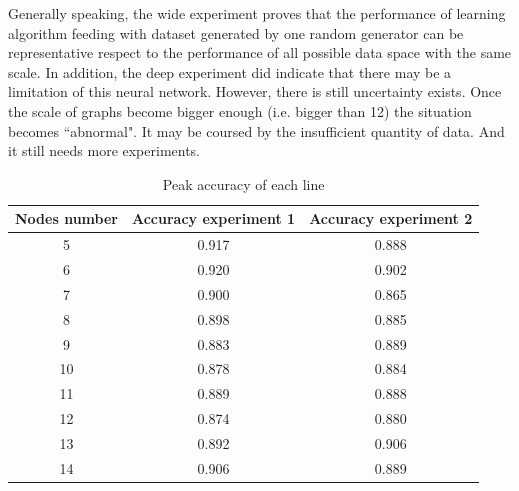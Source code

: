 Generally speaking, the wide experiment proves that the performance of learning algorithm feeding with dataset generated by one random generator can be representative respect to the performance of all possible data space with the same scale.
In addition, the deep experiment did indicate that there may be a limitation of this neural network. 
However, there is still uncertainty exists.
Once the scale of graphs become bigger enough (i.e. bigger than 12) the situation becomes ``abnormal".
It may be coursed by the insufficient quantity of data.
And it still needs more experiments.


\begin{table}[h]
\centering
\small
\begin{tabular}{ |c|c|c| } 
 \hline
    \textbf{Nodes number} & \textbf{Accuracy experiment 1} & \textbf{Accuracy experiment 2} \\
 \hline
    5 & 0.917 & 0.888 \\
    6 & 0.920 & 0.902 \\
    7 & 0.900 & 0.865 \\
    8 & 0.898 & 0.885 \\
    9 & 0.883 & 0.889 \\
    10 & 0.878 & 0.884\\
    11 & 0.889 & 0.888\\
    12 & 0.874 & 0.880\\
    13 & 0.892 & 0.906 \\
    14 & 0.906 & 0.889 \\
 \hline
\end{tabular}
\caption{Peak accuracy of each line}
\label{tab:pnl}
\end{table}

